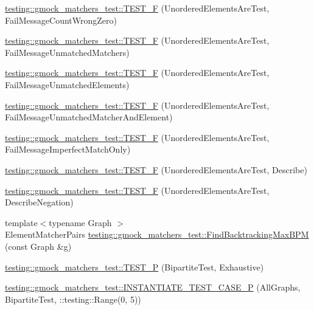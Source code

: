 \begin{DoxyCompactItemize}
\hyperlink{namespacetesting_1_1gmock__matchers__test_a7dc8c467fe0d6f26c0ee643be56eb590}{testing\+::gmock\+\_\+matchers\+\_\+test\+::\+T\+E\+S\+T\+\_\+F} (Unordered\+Elements\+Are\+Test, Fail\+Message\+Count\+Wrong\+Zero)
\item 
\hyperlink{namespacetesting_1_1gmock__matchers__test_a11b785087491ae58b074fa8dbbc88cd4}{testing\+::gmock\+\_\+matchers\+\_\+test\+::\+T\+E\+S\+T\+\_\+F} (Unordered\+Elements\+Are\+Test, Fail\+Message\+Unmatched\+Matchers)
\item 
\hyperlink{namespacetesting_1_1gmock__matchers__test_a6dfb50dcbb543de71fcc4d09844d36b3}{testing\+::gmock\+\_\+matchers\+\_\+test\+::\+T\+E\+S\+T\+\_\+F} (Unordered\+Elements\+Are\+Test, Fail\+Message\+Unmatched\+Elements)
\item 
\hyperlink{namespacetesting_1_1gmock__matchers__test_a2395b7e71b7ad50af72caa61c10e6898}{testing\+::gmock\+\_\+matchers\+\_\+test\+::\+T\+E\+S\+T\+\_\+F} (Unordered\+Elements\+Are\+Test, Fail\+Message\+Unmatched\+Matcher\+And\+Element)
\item 
\hyperlink{namespacetesting_1_1gmock__matchers__test_ac70f9f9717f35352349b076654094f6a}{testing\+::gmock\+\_\+matchers\+\_\+test\+::\+T\+E\+S\+T\+\_\+F} (Unordered\+Elements\+Are\+Test, Fail\+Message\+Imperfect\+Match\+Only)
\item 
\hyperlink{namespacetesting_1_1gmock__matchers__test_a937f4d835023cd6322eb7d32596f3f43}{testing\+::gmock\+\_\+matchers\+\_\+test\+::\+T\+E\+S\+T\+\_\+F} (Unordered\+Elements\+Are\+Test, Describe)
\item 
\hyperlink{namespacetesting_1_1gmock__matchers__test_a3c4c92b68a08c5d541e46ed367e216ab}{testing\+::gmock\+\_\+matchers\+\_\+test\+::\+T\+E\+S\+T\+\_\+F} (Unordered\+Elements\+Are\+Test, Describe\+Negation)
\item 
{\footnotesize template$<$typename Graph $>$ }\\Element\+Matcher\+Pairs \hyperlink{namespacetesting_1_1gmock__matchers__test_a09321a8d4a4c40ab1e369fbdf92b0414}{testing\+::gmock\+\_\+matchers\+\_\+test\+::\+Find\+Backtracking\+Max\+B\+PM} (const Graph \&g)
\item 
\hyperlink{namespacetesting_1_1gmock__matchers__test_a20589d957fcfe5399e249084dbc23e82}{testing\+::gmock\+\_\+matchers\+\_\+test\+::\+T\+E\+S\+T\+\_\+P} (Bipartite\+Test, Exhaustive)
\item 
\hyperlink{namespacetesting_1_1gmock__matchers__test_a16ff96ce4f97da6215f889baccd57e87}{testing\+::gmock\+\_\+matchers\+\_\+test\+::\+I\+N\+S\+T\+A\+N\+T\+I\+A\+T\+E\+\_\+\+T\+E\+S\+T\+\_\+\+C\+A\+S\+E\+\_\+P} (All\+Graphs, Bipartite\+Test, \+::testing\+::\+Range(0, 5))

\end{DoxyCompactItemize}
